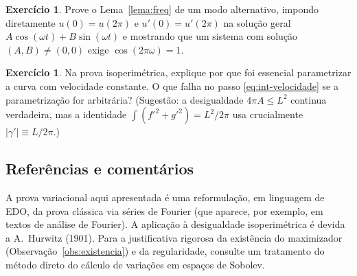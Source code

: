 \documentclass[11pt,a4paper]{amsart}
\theoremstyle{plain}
\theoremstyle{definition}
\newtheorem{exercicio}[teorema]{Exercício}
\theoremstyle{remark}
\begin{document}
\begin{exercicio}
Prove o Lema~\ref{lema:freq} de um modo alternativo, impondo diretamente
$u(0)=u(2\pi)$ e $u'(0)=u'(2\pi)$ na solu\c{c}\~ao geral
$A\cos(\omega t)+B\sin(\omega t)$ e mostrando que um sistema com solu\c{c}\~ao
$(A,B)\neq(0,0)$ exige $\cos(2\pi\omega)=1$.
\end{exercicio}

\begin{exercicio}
Na prova isoperim\'etrica, explique por que foi essencial parametrizar a curva
com velocidade constante. O que falha no passo \eqref{eq:int-velocidade} se a
parametriza\c{c}\~ao for arbitr\'aria? (Sugest\~ao: a desigualdade
$4\pi A\le L^2$ continua verdadeira, mas a identidade
$\int(f'^2+g'^2)=L^2/2\pi$ usa crucialmente $|\gamma'|\equiv L/2\pi$.)
\end{exercicio}

\subsection*{Refer\^encias e coment\'arios}
A prova variacional aqui apresentada \'e uma reformula\c{c}\~ao, em linguagem
de EDO, da prova cl\'assica via s\'eries de Fourier (que aparece, por exemplo,
em textos de an\'alise de Fourier). A aplica\c{c}\~ao \`a desigualdade
isoperim\'etrica \'e devida a A.~Hurwitz (1901). Para a justificativa
rigorosa da exist\^encia do maximizador (Observa\c{c}\~ao~\ref{obs:existencia})
e da regularidade, consulte um tratamento do m\'etodo direto do c\'alculo de
varia\c{c}\~oes em espa\c{c}os de Sobolev.
\end{document}
